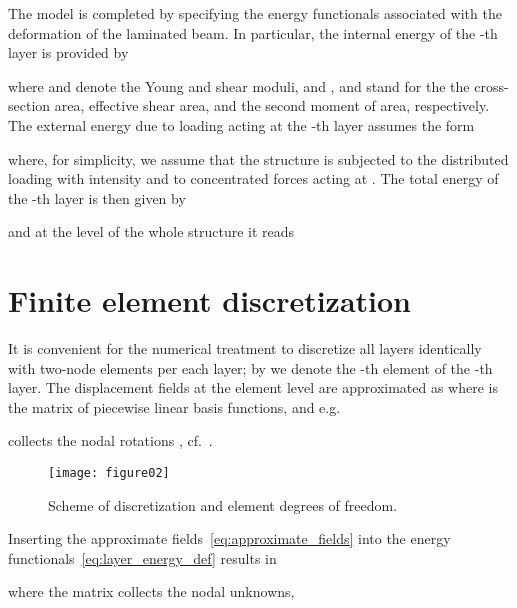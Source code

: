 \documentclass[11pt]{article}
\begin{document}
The model is completed by specifying the energy functionals associated
with the deformation of the laminated beam. In particular, the internal energy
of the -th layer is provided by~\cite{Ibrahimbegovic:1993:FEA}

where  and  denote the Young and shear moduli, and 
,  and  stand for the the cross-section area, effective shear area, and the
second moment of area, respectively.
The external energy due to loading acting at the -th layer assumes the form

where, for simplicity, we assume that the structure is subjected to the
distributed loading with intensity  and to
 concentrated forces  acting
at . The total energy of the -th layer is then given by 

and at the level of the whole structure it reads


\section{Finite element discretization}\label{sec:discretization}
It is convenient for the numerical treatment to discretize all layers
identically with  two-node elements per each layer; by
 we denote the -th element of the -th layer. The displacement fields at the
element level are approximated as
where  is the matrix of piecewise linear basis functions, and e.g.

collects the nodal rotations , cf.~.

\begin{figure}[ht]
\centerline{
 \texttt{[image: figure02]} 
}
\caption{Scheme of discretization and element degrees of freedom.}
\label{fig:lam_beam_discr}
\end{figure}

Inserting the approximate fields~\eqref{eq:approximate_fields} into the energy
functionals~\eqref{eq:layer_energy_def} results in

where the matrix  collects the nodal unknowns, 
\end{document}
